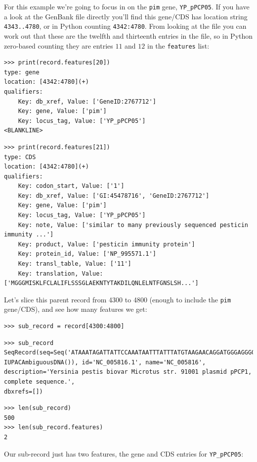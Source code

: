 \documentclass{report}
\begin{document}
For this example we're going to focus in on the \verb|pim| gene, \verb|YP_pPCP05|.
If you have a look at the GenBank file directly you'll find this gene/CDS has
location string \texttt{4343..4780}, or in Python counting \texttt{4342:4780}.
From looking at the file you can work out that these are the twelfth and
thirteenth entries in the file, so in Python zero-based counting they are
entries $11$ and $12$ in the \texttt{features} list:

\begin{verbatim}
>>> print(record.features[20])
type: gene
location: [4342:4780](+)
qualifiers:
    Key: db_xref, Value: ['GeneID:2767712']
    Key: gene, Value: ['pim']
    Key: locus_tag, Value: ['YP_pPCP05']
<BLANKLINE>
\end{verbatim}
\begin{verbatim}
>>> print(record.features[21])
type: CDS
location: [4342:4780](+)
qualifiers:
    Key: codon_start, Value: ['1']
    Key: db_xref, Value: ['GI:45478716', 'GeneID:2767712']
    Key: gene, Value: ['pim']
    Key: locus_tag, Value: ['YP_pPCP05']
    Key: note, Value: ['similar to many previously sequenced pesticin immunity ...']
    Key: product, Value: ['pesticin immunity protein']
    Key: protein_id, Value: ['NP_995571.1']
    Key: transl_table, Value: ['11']
    Key: translation, Value: ['MGGGMISKLFCLALIFLSSSGLAEKNTYTAKDILQNLELNTFGNSLSH...']
\end{verbatim}

Let's slice this parent record from 4300 to 4800 (enough to include the \verb|pim|
gene/CDS), and see how many features we get:

\begin{verbatim}
>>> sub_record = record[4300:4800]
\end{verbatim}
\begin{verbatim}
>>> sub_record
SeqRecord(seq=Seq('ATAAATAGATTATTCCAAATAATTTATTTATGTAAGAACAGGATGGGAGGGGGA...TTA',
IUPACAmbiguousDNA()), id='NC_005816.1', name='NC_005816',
description='Yersinia pestis biovar Microtus str. 91001 plasmid pPCP1, complete sequence.',
dbxrefs=[])
\end{verbatim}
\begin{verbatim}
>>> len(sub_record)
500
>>> len(sub_record.features)
2
\end{verbatim}

Our sub-record just has two features, the gene and CDS entries for \verb|YP_pPCP05|:
\end{document}
